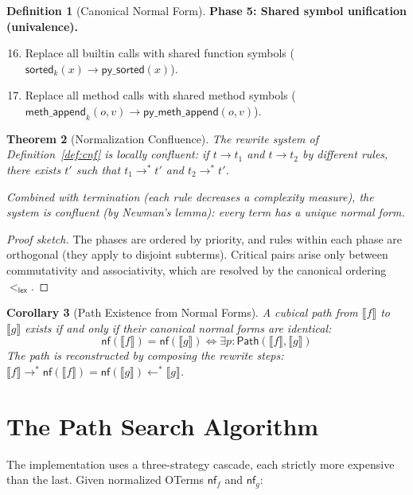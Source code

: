 \documentclass[11pt,a4paper]{report}
\theoremstyle{definition}
\newtheorem{definition}{Definition}[chapter]
\theoremstyle{plain}
\newtheorem{theorem}[definition]{Theorem}
\newtheorem{corollary}[definition]{Corollary}
\newcommand{\den}[1]{\llbracket #1 \rrbracket}
\newcommand{\Path}{\mathsf{Path}}
\begin{document}
\begin{definition}[Canonical Normal Form]
\textbf{Phase 5: Shared symbol unification (univalence).}
\begin{enumerate}
  \setcounter{enumi}{15}
  \item Replace all builtin calls with shared function symbols
    ($\mathsf{sorted}_k(x) \to \mathsf{py\_sorted}(x)$).
  \item Replace all method calls with shared method symbols
    ($\mathsf{meth\_append}_k(o, v) \to
    \mathsf{py\_meth\_append}(o, v)$).
\end{enumerate}
\end{definition}

\begin{theorem}[Normalization Confluence]
\label{thm:confluence}
The rewrite system of Definition~\ref{def:cnf} is \emph{locally
confluent}: if $t \to t_1$ and $t \to t_2$ by different rules,
there exists $t'$ such that $t_1 \to^* t'$ and $t_2 \to^* t'$.

Combined with termination (each rule decreases a complexity measure),
the system is \emph{confluent} (by Newman's lemma): every term has
a unique normal form.
\end{theorem}

\begin{proof}[Proof sketch]
The phases are ordered by priority, and rules within each phase are
orthogonal (they apply to disjoint subterms).  Critical pairs arise
only between commutativity and associativity, which are resolved by
the canonical ordering $<_\mathsf{lex}$.
\end{proof}

\begin{corollary}[Path Existence from Normal Forms]
\label{cor:path-nf}
A cubical path from $\den{f}$ to $\den{g}$ exists if and only if
their canonical normal forms are identical:
\[
  \mathsf{nf}(\den{f}) = \mathsf{nf}(\den{g})
  \iff
  \exists p : \Path(\den{f}, \den{g})
\]
The path is reconstructed by composing the rewrite steps:
$\den{f} \to^* \mathsf{nf}(\den{f}) = \mathsf{nf}(\den{g})
\leftarrow^* \den{g}$.
\end{corollary}

\section{The Path Search Algorithm}
\label{sec:path-search-algo}

The implementation uses a three-strategy cascade, each strictly
more expensive than the last.  Given normalized OTerms
$\mathsf{nf}_f$ and $\mathsf{nf}_g$:
\end{document}
